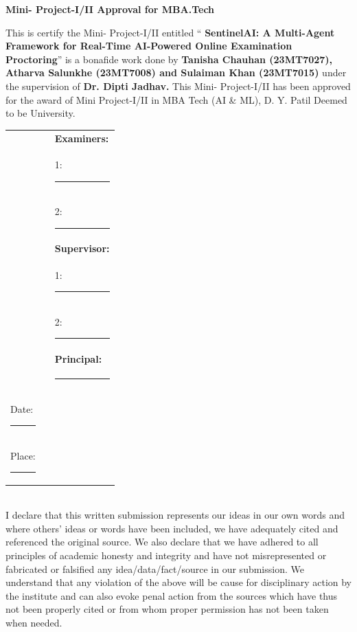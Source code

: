  \cleardoublepage
\begin{center}
{\textbf{\Large Mini- Project-I/II Approval for MBA.Tech}}
\end{center}
\vspace{0.2in}

This is certify the Mini- Project-I/II entitled `` \textbf{SentinelAI: A Multi-Agent Framework for Real-Time AI-Powered Online Examination Proctoring}'' is a bonafide work done by \textbf{Tanisha Chauhan (23MT7027), Atharva Salunkhe (23MT7008) and Sulaiman Khan (23MT7015)} under the supervision of \textbf{Dr. Dipti Jadhav.} This Mini- Project-I/II has been approved for the award of Mini Project-I/II in MBA Tech (AI \& ML), D. Y. Patil Deemed to be University.

\vspace{0.65in}
\begin{table}[h]
\begin{tabular}{p{5cm}p{1cm}p{7cm}}
 & & \textbf{Examiners:} \\
 & & 1: \rule{5cm}{0.4pt} \\
 & & 2: \rule{5cm}{0.4pt} \\[0.3cm]
 & & \textbf{Supervisor:} \\
 & & 1: \rule{5cm}{0.4pt} \\
 & & 2: \rule{5cm}{0.4pt} \\[0.3cm]
 & & \textbf{Principal:} \\
 & & \rule{5cm}{0.4pt} \\[0.5cm]
Date: \rule{4cm}{0.4pt} & & \\
Place: \rule{4cm}{0.4pt} & & 
\end{tabular}
\end{table}

\newpage

\\[0.3in]
I declare that this written submission represents our ideas in our own words and where others' ideas or words have been included, we have adequately cited and referenced the original source. We also declare that we have adhered to all principles of academic honesty and integrity and have not misrepresented or fabricated or falsified any idea/data/fact/source in our submission. We understand that any violation of the above will be cause for disciplinary action by the institute and can also evoke penal action from the sources which have thus not been properly cited or from whom proper permission has not been taken when needed.

